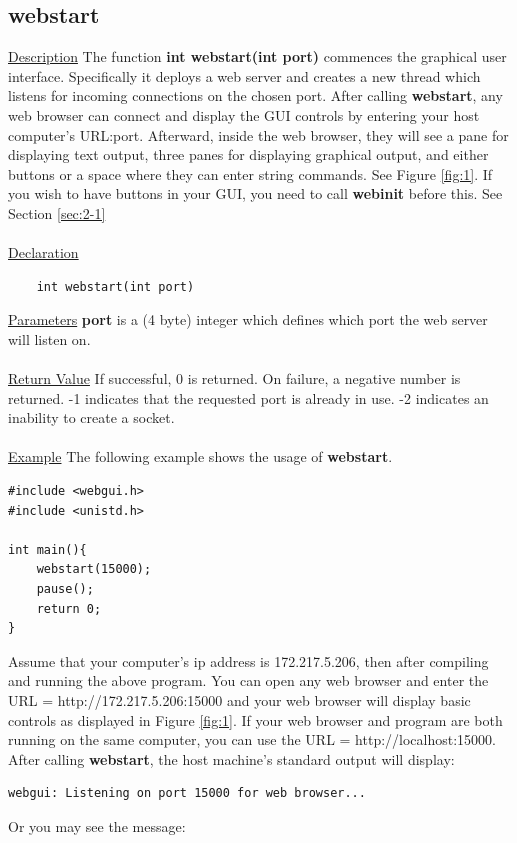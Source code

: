 \subsection{webstart}
\underline{Description} The function \textbf{int webstart(int port)} commences the graphical user interface. Specifically
it deploys a web server and creates a new thread which listens for incoming connections on the chosen port.
After calling \textbf{webstart}, any web browser can connect and display the GUI controls by entering your host
computer's URL:port. Afterward, inside the web browser, they will see a pane for displaying text output, three 
panes for displaying graphical output, and either buttons or a space where they can enter string commands. See Figure
\ref{fig:1}. If you wish to have buttons in your GUI, you need to call \textbf{webinit} before this. See Section \ref{sec:2-1}\\
\\
\underline{Declaration} 
\begin{verbatim} 
	int webstart(int port) 
\end{verbatim}
\underline{Parameters} \textbf{port} is a (4 byte) integer which defines which port the web server will listen on.\\
\\
\underline{Return Value} If successful, 0 is returned. On failure, a negative number is returned. -1 indicates that the
requested port is already in use. -2 indicates an inability to create a socket.\\
\\
\underline{Example} The following example shows the usage of \textbf{webstart}.
\begin{verbatim}
#include <webgui.h>
#include <unistd.h>

int main(){
    webstart(15000);
    pause();
    return 0;
}
\end{verbatim}
Assume that your computer's ip address is 172.217.5.206, then after compiling and running the above program.
You can open any web browser and enter the URL = http://172.217.5.206:15000 and your web browser will
display basic controls as displayed in Figure \ref{fig:1}. If your web browser and program are both running
on the same computer, you can use the URL = http://localhost:15000. After calling \textbf{webstart}, the host machine's 
standard output will display:
\begin{verbatim}
webgui: Listening on port 15000 for web browser...
\end{verbatim}
Or you may see the message:
